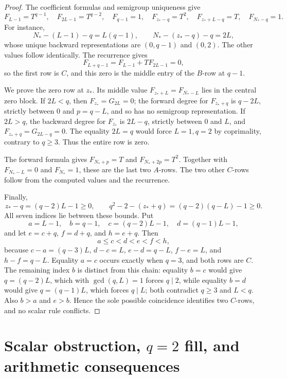 \documentclass[11pt]{article}
\theoremstyle{remark}
\numberwithin{equation}{section}
\begin{document}
\begin{proof}
The coefficient formulas and semigroup uniqueness give
\[
 F_{L-1}=T^{q-1},\quad F_{2L-1}=T^{q-2},\quad
 F_{q-1}=1,\quad F_{z_\ast-q}=T^2,\quad
 F_{z_\ast+L-q}=T,\quad F_{N_\ast-q}=1.
\]
For instance,
\[
 N_\ast-(L-1)-q=L(q-1),\qquad
 N_\ast-(z_\ast-q)-q=2L,
\]
whose unique backward representations are \((0,q-1)\) and \((0,2)\).  The other values follow identically.  The recurrence gives
\[
 F_{L+q-1}=F_{L-1}+T F_{2L-1}=0,
\]
so the first row is \(C\), and this zero is the middle entry of the \(B\)-row at \(q-1\).

We prove the zero row at \(z_\ast\).  Its middle value \(F_{z_\ast+L}=F_{N_\ast-L}\) lies in the central zero block.  If \(2L<q\), then \(F_{z_\ast}=G_{2L}=0\); the forward degree for \(F_{z_\ast+q}\) is \(q-2L\), strictly between \(0\) and \(p=q-L\), and so has no semigroup representation.  If \(2L>q\), the backward degree for \(F_{z_\ast}\) is \(2L-q\), strictly between \(0\) and \(L\), and \(F_{z_\ast+q}=G_{2L-q}=0\).  The equality \(2L=q\) would force \(L=1,q=2\) by coprimality, contrary to \(q\geq3\).  Thus the entire row is zero.

The forward formula gives \(F_{N_\ast+p}=T\) and \(F_{N_\ast+2p}=T^2\).  Together with \(F_{N_\ast-L}=0\) and \(F_{N_\ast}=1\), these are the last two \(A\)-rows.  The two other \(C\)-rows follow from the computed values and the recurrence.

Finally,
\[
 z_\ast-q=(q-2)L-1\geq0,\qquad
 q^2-2-(z_\ast+q)=(q-2)(q-L)-1\geq0.
\]
All seven indices lie between these bounds.  Put
\[
 a=L-1,\quad b=q-1,\quad c=(q-2)L-1,\quad d=(q-1)L-1,
\]
and let \(e=c+q\), \(f=d+q\), and \(h=e+q\).  Then
\[
 a\leq c<d<e<f<h,
\]
because \(c-a=(q-3)L\), \(d-c=L\), \(e-d=q-L\), \(f-e=L\), and \(h-f=q-L\).  Equality \(a=c\) occurs exactly when \(q=3\), and both rows are \(C\).  The remaining index \(b\) is distinct from this chain: equality \(b=c\) would give \(q=(q-2)L\), which with \(\gcd(q,L)=1\) forces \(q\mid2\), while equality \(b=d\) would give \(q=(q-1)L\), which forces \(q\mid L\); both contradict \(q\geq3\) and \(L<q\).  Also \(b>a\) and \(e>b\).  Hence the sole possible coincidence identifies two \(C\)-rows, and no scalar rule conflicts.
\end{proof}


\section{Scalar obstruction, \(q=2\) fill, and arithmetic consequences}\label{sec:scalar}
\end{document}
